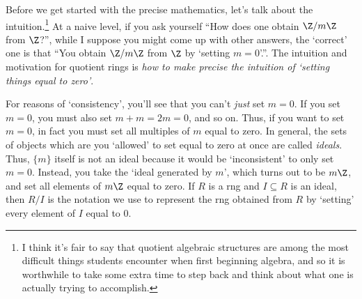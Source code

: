 Before we get started with the precise mathematics, let's talk about the intuition.\footnote{I think it's fair to say that quotient algebraic structures are among the most difficult things students encounter when first beginning algebra, and so it is worthwhile to take some extra time to step back and think about what one is actually trying to accomplish.}  At a naive level, if you ask yourself ``How does one obtain $\Z /m\Z$ from $\Z$?'', while I suppose you might come up with other answers, the `correct' one is that ``You obtain $\Z /m\Z$ from $\Z$ by `setting $m=0$'.''.  The intuition and motivation for quotient rings is \emph{how to make precise the intuition of `setting things equal to zero'}.

For reasons of `consistency', you'll see that you can't \emph{just} set $m=0$.  If you set $m=0$, you must also set $m+m=2m=0$, and so on.  Thus, if you want to set $m=0$, in fact you must set all multiples of $m$ equal to zero.  In general, the sets of objects which are you `allowed' to set equal to zero at once are called \emph{ideals}.  Thus, $\{ m\}$ itself is not an ideal because it would be `inconsistent' to only set $m=0$.  Instead, you take the `ideal generated by $m$', which turns out to be $m\Z$, and set all elements of $m\Z$ equal to zero.  If $R$ is a rng and $I\subseteq R$ is an ideal, then $R/I$ is the notation we use to represent the rng obtained from $R$ by `setting' every element of $I$ equal to $0$.

